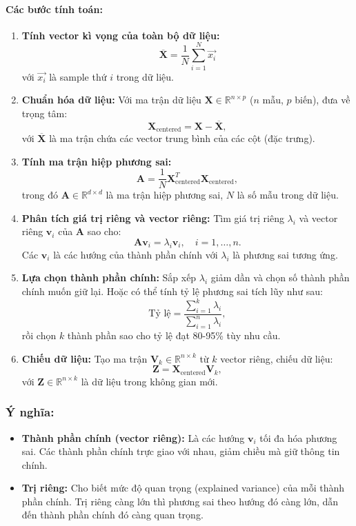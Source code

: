 \paragraph{Các bước tính toán:}
\begin{enumerate}
  \item \textbf{Tính vector kì vọng của toàn bộ dữ liệu:}
    \[
        \mathbf{\overline{X}} = \frac{1}{N} \sum_{i=1}^{N} \vec{x_i}
    \]
    với $\vec{x_i}$ là sample thứ $i$ trong dữ liệu.
  \item \textbf{Chuẩn hóa dữ liệu:} Với ma trận dữ liệu $\mathbf{X} \in \mathbb{R}^{n \times p}$ ($n$ mẫu, $p$ biến), đưa về trọng tâm: 
      \[
      \mathbf{X}_{\text{centered}} = \mathbf{X} - \mathbf{\overline{X}},
      \]
      với $\mathbf{\overline{X}}$ là ma trận chứa các vector trung bình của các cột (đặc trưng). 
  \item \textbf{Tính ma trận hiệp phương sai:} 
      \[
      \mathbf{A} = \frac{1}{N} \mathbf{X}_{\text{centered}}^T \mathbf{X}_{\text{centered}},
      \]
      trong đó $\mathbf{A} \in \mathbb{R}^{d \times d}$ là ma trận hiệp phương sai, $N$ là số mẫu trong dữ liệu.
  \item \textbf{Phân tích giá trị riêng và vector riêng:} Tìm giá trị riêng $\lambda_i$ và vector riêng $\mathbf{v}_i$ của $\mathbf{A}$ sao cho:
      \[
      \mathbf{A} \mathbf{v}_i = \lambda_i \mathbf{v}_i, \quad i = 1, \dots, n.
      \]
      Các $\mathbf{v}_i$ là các hướng của thành phần chính với $\lambda_i$ là phương sai tương ứng.
  \item \textbf{Lựa chọn thành phần chính:} Sắp xếp $\lambda_i$ giảm dần và chọn số thành phần chính muốn giữ lại. Hoặc có thể tính tỷ lệ phương sai tích lũy như sau:
      \[
      \text{Tỷ lệ} = \frac{\sum_{i=1}^k \lambda_i}{\sum_{i=1}^n \lambda_i},
      \]
      rồi chọn $k$ thành phần sao cho tỷ lệ đạt 80-95\% tùy nhu cầu.
  \item \textbf{Chiếu dữ liệu:} Tạo ma trận $\mathbf{V}_k \in \mathbb{R}^{n \times k}$ từ $k$ vector riêng, chiếu dữ liệu:
      \[
      \mathbf{Z} = \mathbf{X}_{\text{centered}} \mathbf{V}_k,
      \]
      với $\mathbf{Z} \in \mathbb{R}^{n \times k}$ là dữ liệu trong không gian mới.
\end{enumerate}

\subsubsection*{Ý nghĩa:} 
\begin{itemize}
  \item \textbf{Thành phần chính (vector riêng):} Là các hướng $\mathbf{v}_i$ tối đa hóa phương sai. Các thành phần chính trực giao với nhau, giảm chiều mà giữ thông tin chính.
  \item \textbf{Trị riêng:} Cho biết mức độ quan trọng (explained variance) của mỗi thành phần chính. Trị riêng càng lớn thì phương sai theo hướng đó càng lớn, dẫn đến thành phần chính đó càng quan trọng.
\end{itemize}

